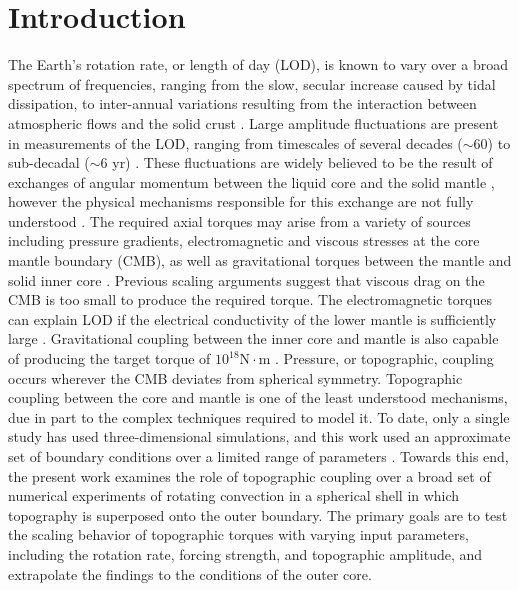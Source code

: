 \section{Introduction}
\label{S:25intro}

The Earth's rotation rate, or length of day (LOD), is known to vary over a broad spectrum of frequencies, ranging from the slow, secular increase caused by tidal dissipation, to inter-annual variations resulting from the interaction between atmospheric flows and the solid crust \cite[e.g.][]{jW88,kL05}. \textcolor{\revtxt}{Large amplitude fluctuations are present in measurements of the LOD, ranging from timescales of several decades ($\sim 60$) \citep{rH98} to sub-decadal ($\sim 6$ yr) \citep{rH15}. These fluctuations} are widely believed to be the result of exchanges of angular momentum between the liquid core and the solid mantle \citep{dJ88,aJ93,rH15}, however the physical \textcolor{\revtxt}{mechanisms responsible for this exchange are not fully understood \citep[e.g.][]{pR12}. The required axial torques} may arise from a variety of sources including pressure gradients, electromagnetic and viscous stresses at the core mantle boundary (CMB), as well as gravitational torques between the mantle and solid inner core \citep{bB96}. 
\textcolor{\revtxt}{Previous scaling arguments \citep[e.g.][]{pR12} suggest that viscous drag on the CMB is too small to produce the required torque. 
}
The electromagnetic torques can explain LOD  if the electrical conductivity of the lower mantle is sufficiently large \citep[e.g.][]{rH98}. 
	Gravitational coupling between the inner core and mantle is also capable of producing the target torque of $10^{18} \text{N}\cdot \text{m} $ \citep{bB96,bB09}.
Pressure, or topographic, coupling occurs wherever the CMB deviates from spherical symmetry. 
Topographic coupling between the core and mantle is one of the least understood mechanisms, due in part to the complex techniques required to model it. To date, only a single study has used three-dimensional simulations, and this work used an approximate set of boundary conditions over a limited range of parameters \citep{wK01}. 
Towards this end, the present work examines the role of topographic coupling over a broad set of numerical experiments of rotating convection in a spherical shell in which topography is superposed onto the outer boundary. The primary goals are to test the scaling behavior of topographic torques with varying input parameters, including the rotation rate, forcing strength, and topographic amplitude, and extrapolate the findings to the conditions of the outer core.

